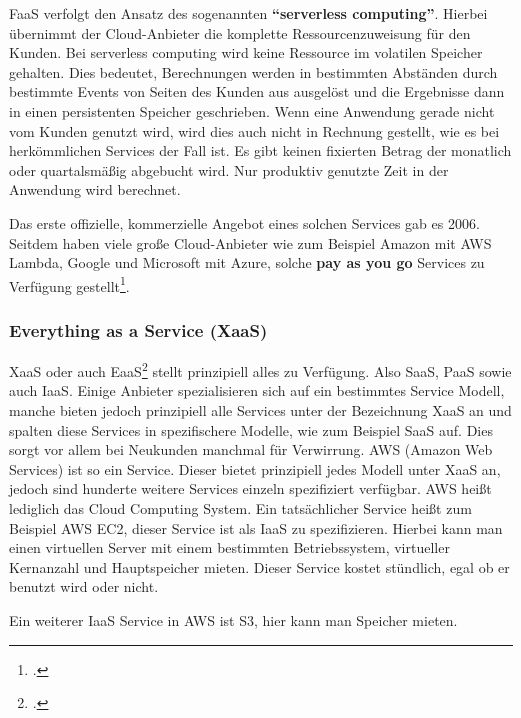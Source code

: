 FaaS verfolgt den Ansatz des sogenannten \textbf{"`serverless computing"'}. Hierbei übernimmt der Cloud-Anbieter die komplette Ressourcenzuweisung für den Kunden.
Bei serverless computing wird keine Ressource im volatilen Speicher gehalten.
Dies bedeutet, Berechnungen werden in bestimmten Abständen durch bestimmte Events von Seiten des Kunden aus ausgelöst und die Ergebnisse dann in einen persistenten Speicher geschrieben.
Wenn eine Anwendung gerade nicht vom Kunden genutzt wird, wird dies auch nicht in Rechnung gestellt, wie es bei herkömmlichen Services der Fall ist.
Es gibt keinen fixierten Betrag der monatlich oder quartalsmäßig abgebucht wird.
Nur produktiv genutzte Zeit in der Anwendung wird berechnet.

Das erste offizielle, kommerzielle Angebot eines solchen Services gab es 2006.
Seitdem haben viele große Cloud-Anbieter wie zum Beispiel Amazon mit AWS Lambda, Google und Microsoft mit Azure, solche \textbf{pay as you go} Services zu Verfügung gestellt\footcite{cloud-computing}.

\subsubsection{Everything as a Service (XaaS)}
XaaS oder auch EaaS\footcite{cloud-eaas} stellt prinzipiell alles zu Verfügung. Also SaaS, PaaS sowie auch IaaS.
Einige Anbieter spezialisieren sich auf ein bestimmtes Service Modell, manche bieten jedoch prinzipiell alle Services unter der Bezeichnung XaaS an und spalten diese Services in spezifischere Modelle, wie zum Beispiel SaaS auf.
Dies sorgt vor allem bei Neukunden manchmal für Verwirrung. AWS (Amazon Web Services) ist so ein Service.
Dieser bietet prinzipiell jedes Modell unter XaaS an, jedoch sind hunderte weitere Services einzeln spezifiziert verfügbar. AWS heißt lediglich das Cloud Computing System.
Ein tatsächlicher Service heißt zum Beispiel AWS EC2, dieser Service ist als IaaS zu spezifizieren.
Hierbei kann man einen virtuellen Server mit einem bestimmten Betriebssystem, virtueller Kernanzahl und Hauptspeicher mieten. Dieser Service kostet stündlich, egal ob er benutzt wird oder nicht.

Ein weiterer IaaS Service in AWS ist S3, hier kann man Speicher mieten.

